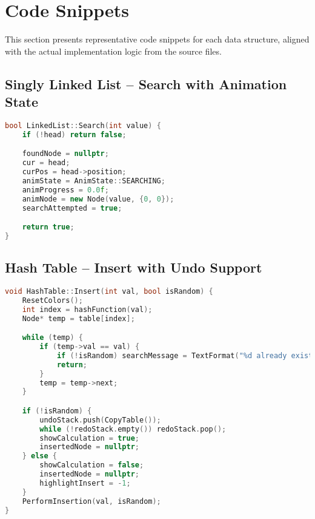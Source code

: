 \clearpage
\section{Code Snippets}

This section presents representative code snippets for each data structure, aligned with the actual implementation logic from the source files.

\subsection*{Singly Linked List – Search with Animation State}
\begin{lstlisting}[language=C++, caption={SLL Search with Animation Setup}]
bool LinkedList::Search(int value) {
    if (!head) return false;

    foundNode = nullptr;
    cur = head;
    curPos = head->position;
    animState = AnimState::SEARCHING;
    animProgress = 0.0f;
    animNode = new Node(value, {0, 0});
    searchAttempted = true;

    return true;
}
\end{lstlisting}
\subsection*{Hash Table – Insert with Undo Support}
\begin{lstlisting}[language=C++, caption={Hash Table Insert with Chaining and Undo}]
void HashTable::Insert(int val, bool isRandom) {
    ResetColors();
    int index = hashFunction(val);
    Node* temp = table[index];

    while (temp) {
        if (temp->val == val) {
            if (!isRandom) searchMessage = TextFormat("%d already exists.", val);
            return;
        }
        temp = temp->next;
    }

    if (!isRandom) {
        undoStack.push(CopyTable());
        while (!redoStack.empty()) redoStack.pop();
        showCalculation = true;
        insertedNode = nullptr;
    } else {
        showCalculation = false;
        insertedNode = nullptr;
        highlightInsert = -1;
    }
    PerformInsertion(val, isRandom);
}
\end{lstlisting}
